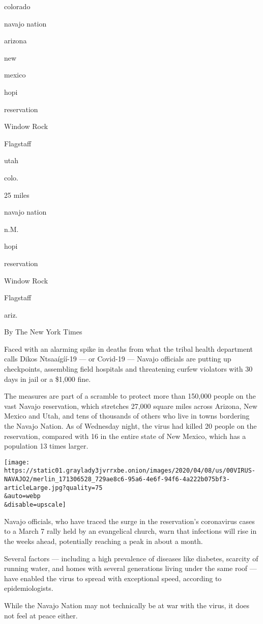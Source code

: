 colorado

navajo nation

arizona

new

mexico

hopi

reservation

Window Rock

Flagstaff

utah

colo.

25 miles

navajo nation

n.M.

hopi

reservation

Window Rock

Flagstaff

ariz.

By The New York Times

Faced with an alarming spike in deaths from what the tribal health
department calls Dikos Ntsaaígíí-19 --- or Covid-19 --- Navajo officials
are putting up checkpoints, assembling field hospitals and threatening
curfew violators with 30 days in jail or a \$1,000 fine.

The measures are part of a scramble to protect more than 150,000 people
on the vast Navajo reservation, which stretches 27,000 square miles
across Arizona, New Mexico and Utah, and tens of thousands of others who
live in towns bordering the Navajo Nation. As of Wednesday night, the
virus had killed 20 people on the reservation, compared with 16 in the
entire state of New Mexico, which has a population 13 times larger.

\texttt{[image: https://static01.graylady3jvrrxbe.onion/images/2020/04/08/us/00VIRUS-NAVAJO2/merlin\_171306528\_729ae8c6-95a6-4e6f-94f6-4a222b075bf3-articleLarge.jpg?quality=75\\\&auto=webp\\\&disable=upscale]}

Navajo officials, who have traced the surge in the reservation's
coronavirus cases to a March 7 rally held by an evangelical church, warn
that infections will rise in the weeks ahead, potentially reaching a
peak in about a month.

Several factors --- including a high prevalence of diseases like
diabetes, scarcity of running water, and homes with several generations
living under the same roof --- have enabled the virus to spread with
exceptional speed, according to epidemiologists.

While the Navajo Nation may not technically be at war with the virus, it
does not feel at peace either.

